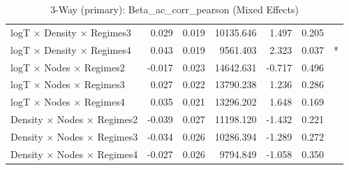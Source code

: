 \begin{table}[ht]
\begin{tabular}{lrrrrrl}
  logT × Density × Regimes3 & 0.029 & 0.019 & 10135.646 & 1.497 & 0.205 &  \\ 
  logT × Density × Regimes4 & 0.043 & 0.019 & 9561.403 & 2.323 & 0.037 & * \\ 
  logT × Nodes × Regimes2 & -0.017 & 0.023 & 14642.631 & -0.717 & 0.496 &  \\ 
  logT × Nodes × Regimes3 & 0.027 & 0.022 & 13790.238 & 1.236 & 0.286 &  \\ 
  logT × Nodes × Regimes4 & 0.035 & 0.021 & 13296.202 & 1.648 & 0.169 &  \\ 
  Density × Nodes × Regimes2 & -0.039 & 0.027 & 11198.120 & -1.432 & 0.221 &  \\ 
  Density × Nodes × Regimes3 & -0.034 & 0.026 & 10286.394 & -1.289 & 0.272 &  \\ 
  Density × Nodes × Regimes4 & -0.027 & 0.026 & 9794.849 & -1.058 & 0.350 &  \\ 
   \hline
\end{tabular}
\caption{3-Way (primary): Beta_ac_corr_pearson (Mixed Effects)} 
\end{table}
